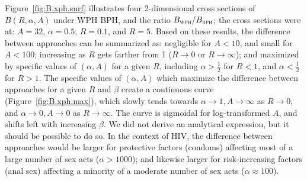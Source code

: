 Figure~\ref{fig:B.xph.surf} illustrates four 2-dimensional cross sections of $B(R,\alpha,A)$
under WPH \vs BPH, and the ratio $B_{\textsc{wph}} / B_{\textsc{bph}}$;
the cross sections were at: $A = 32$, $\alpha = 0.5$, $R = 0.1$, and $R = 5$.
Based on these results, the difference between approaches can be summarized as:
negligible for $A < 10$, and small for $A < 100$;
increasing as $R$ gets farther from 1 ($R \rightarrow 0$ or $R \rightarrow \infty$); and
maximized by specific values of $(\alpha,A)$ for a given $R$, including
$\alpha > \frac12$ for $R < 1$, and $\alpha < \frac12$ for $R > 1$.
The specific values of $(\alpha,A)$ which maximize
the difference between approaches for a given $R$ and $\beta$
create a continuous curve (Figure~\ref{fig:B.xph.max}), which slowly tends towards
$\alpha \rightarrow 1, A \rightarrow \infty$ as $R \rightarrow 0$, and
$\alpha \rightarrow 0, A \rightarrow 0$ as $R \rightarrow \infty$.
The curve is sigmoidal for log-transformed $A$,
and shifts left with increasing $\beta$.
We did not derive an analytical expression, but it should be possible to do so.
In the context of HIV, the difference between approaches would be
larger for protective factors (\eg condoms)
affecting most of a large number of sex acts ($\alpha > 1000$);
and likewise larger for risk-increasing factors (\eg anal sex)
affecting a minority of a moderate number of sex acts ($\alpha \approx 100$).
